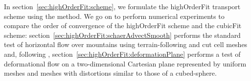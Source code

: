 In section~\ref{sec:highOrderFit:scheme}, we formulate the highOrderFit transport scheme using the \kexact{} method.
We go on to perform numerical experiments to compare the order of convergence of the highOrderFit scheme and the cubicFit scheme: section~\ref{sec:highOrderFit:schaerAdvectSmooth} performs the standard test of horizontal flow over mountains using terrain-following and cut cell meshes and, following \citet{chen2017}, section~\ref{sec:highOrderFit:deformationPlane} performs a test of deformational flow on a two-dimensional Cartesian plane represented by uniform meshes and meshes with distortions similar to those of a cubed-sphere.





